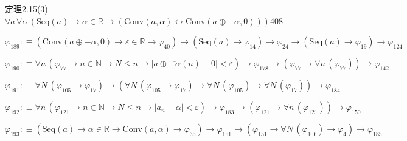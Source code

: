 \begin{fullproof}{定理2.15(3)}{$\forall a\,\forall \alpha\,(\mathrm{Seq}(a) \to \alpha \in \mathbb{R} \to (\mathrm{Conv}(a,\alpha) \leftrightarrow \mathrm{Conv}(a \oplus \overline{-\alpha},0)))$}{408}
\begin{abbrevlist}
\item $\varphi_{189} :\equiv (\mathrm{Conv}(a \oplus \overline{-\alpha},0) \to \varepsilon \in \mathbb{R} \to \varphi_{40}) \to (\mathrm{Seq}(a) \to \varphi_{14}) \to \varphi_{24} \to (\mathrm{Seq}(a) \to \varphi_{19}) \to \varphi_{124}$
\item $\varphi_{190} :\equiv \forall n\,(\varphi_{77} \to n \in \mathbb{N} \to N \leq n \to \lvert a \oplus \overline{-\alpha}(n) - 0 \rvert < \varepsilon) \to \varphi_{178} \to (\varphi_{77} \to \forall n\,(\varphi_{77})) \to \varphi_{142}$
\item $\varphi_{191} :\equiv \forall N\,(\varphi_{105} \to \varphi_{17}) \to (\forall N\,(\varphi_{105} \to \varphi_{17}) \to \forall N\,(\varphi_{105}) \to \forall N\,(\varphi_{17})) \to \varphi_{184}$
\item $\varphi_{192} :\equiv \forall n\,(\varphi_{121} \to n \in \mathbb{N} \to N \leq n \to \lvert a_{n} - \alpha \rvert < \varepsilon) \to \varphi_{183} \to (\varphi_{121} \to \forall n\,(\varphi_{121})) \to \varphi_{150}$
\item $\varphi_{193} :\equiv (\mathrm{Seq}(a) \to \alpha \in \mathbb{R} \to \mathrm{Conv}(a,\alpha) \to \varphi_{35}) \to \varphi_{151} \to (\varphi_{151} \to \forall N\,(\varphi_{106}) \to \varphi_{4}) \to \varphi_{185}$
\end{abbrevlist}
\end{fullproof}
